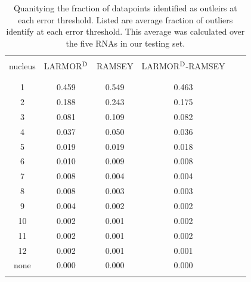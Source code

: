 \documentclass[fleqn,10pt]{wlscirep}
\begin{document}
\renewcommand\thetable{S\arabic{table}}    
\setcounter{table}{0}    
\begin{table}[h]
\centering
\begin{threeparttable}
\begin{tabular}{c c c c c c}
\hline
\\
nucleus  & LARMOR$^{\rm D}$ & RAMSEY  & LARMOR$^{\rm D}$-RAMSEY\\
\\
\hline
\\
1    & 0.459 & 0.549 & 0.463  \\
2    & 0.188 & 0.243 & 0.175  \\
3    & 0.081 & 0.109 & 0.082  \\
4    & 0.037 & 0.050 & 0.036  \\
5    & 0.019 & 0.019 & 0.018  \\
6    & 0.010 & 0.009 & 0.008  \\
7    & 0.008 & 0.004 & 0.004  \\
8    & 0.008 & 0.003 & 0.003  \\
9    & 0.004 & 0.002 & 0.002  \\
10   & 0.002 & 0.001 & 0.002  \\
11   & 0.002 & 0.001 & 0.002  \\
12   & 0.002 & 0.001 & 0.001  \\
none & 0.000 & 0.000 & 0.000  \\
 \\
\hline
\end{tabular}
\end{threeparttable}
\caption{\label{tab:fraction_removed}  Quanitying the fraction of datapoints identified as outleirs at each error threshold. Listed are average fraction of outliers identify at each error threshold. This average was calculated over the five RNAs in our testing set.}
\end{table}
\end{document}
